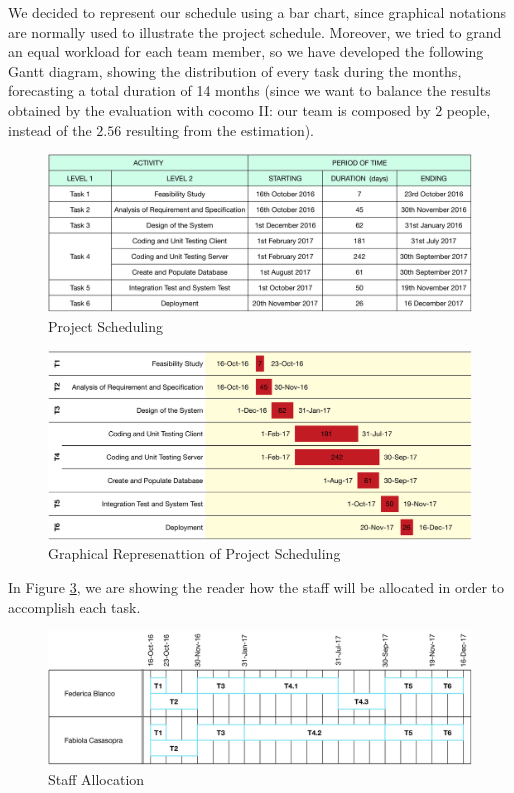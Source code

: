 We decided to represent our schedule using a bar chart, since graphical notations are normally used to illustrate the project schedule.
Moreover, we tried to grand an equal workload for each team member, so we have developed the following Gantt diagram, showing the distribution of every task during the months, forecasting a total duration of 14 months (since we want to balance the results obtained by the evaluation with \acs{cocomo} II: our team is composed by $2$ people, instead of the $2.56$ resulting from the estimation).

\begin{figure}[htbp]
\centering
\includegraphics[width=\textwidth]{Images/scheduling}
\caption{Project Scheduling}
\label{fig:sched}
\end{figure}

\begin{figure}[htbp]
\centering
\includegraphics[width=\textwidth]{Images/scheduling_bar_chart}
\caption{Graphical Represenattion of Project Scheduling}
\label{fig:chart_sched}
\end{figure}

\clearpage

In Figure \ref{fig:alloc}, we are showing the reader how the staff will be allocated in order to accomplish each task.

\begin{figure}[htbp]
\centering
\includegraphics[width=\textwidth]{Images/staff_allocation}
\caption{Staff Allocation}
\label{fig:alloc}
\end{figure}



